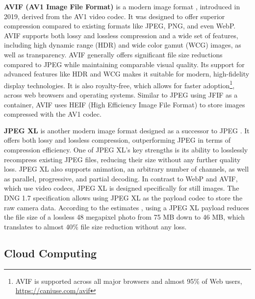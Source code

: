 \textbf{AVIF (AV1 Image File Format)} is a modern image format \cite{barman2020evaluation-avif}, introduced in 2019, derived from the AV1 \cite{han2021technical-av1} video codec. It was designed to offer superior compression compared to existing formats like JPEG, PNG, and even WebP. AVIF supports both lossy and lossless compression and a wide set of features, including high dynamic range (HDR) and wide color gamut (WCG) images, as well as transparency. AVIF generally offers significant file size reductions compared to JPEG while maintaining comparable visual quality. Its support for advanced features like HDR and WCG makes it suitable for modern, high-fidelity display technologies. It is also royalty-free, which allows for faster adoption\footnote{AVIF  is supported across all major browsers and almost 95\% of Web users, \url{https://caniuse.com/avif}}, across web browsers and operating systems. Similar to JPEG using JFIF as a container, AVIF uses HEIF (High Efficiency Image File Format) to store images compressed with the AV1 codec.

\textbf{JPEG XL} is another modern image format designed as a successor to JPEG \cite{alakuijala2023jpegxl}. It offers both lossy and lossless compression, outperforming JPEG in terms of compression efficiency. One of JPEG XL's key strengths is its ability to losslessly recompress existing JPEG files, reducing their size without any further quality loss. JPEG XL also supports animation, an arbitrary number of channels, as well as parallel, progressive, and partial decoding. In contrast to WebP and AVIF, which use video codecs, JPEG XL is designed specifically for still images. The DNG 1.7 specification \cite{adobe2023dng} allows using JPEG XL as the payload codec to store the raw camera data. According to the estimates \cite{sneyers2024jxl-modular}, using a JPEG XL payload reduces the file size of a lossless 48 megapixel photo from 75 MB down to 46 MB, which translates to almost 40\% file size reduction without any loss.


\subsection{Cloud Computing}
\label{sec:cloud-computing}


